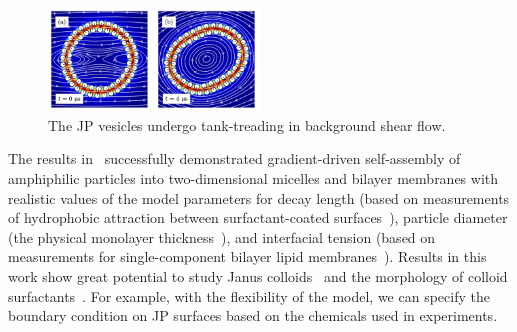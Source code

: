 \begin{figure}
\includegraphics[width=0.5\textwidth]{figures/PreliminaryWork/TankTreading.jpg}
\caption{\label{fig:JPv_linearshear}The JP vesicles undergo tank-treading in background shear flow.}
\end{figure}
The results in~\cite{Fu2018_SIAM}
successfully demonstrated gradient-driven
self-assembly of amphiphilic particles into two-dimensional micelles and
bilayer membranes with realistic values of the model parameters
for decay
length %
(based on measurements of hydrophobic attraction
between surfactant-coated surfaces~\cite{Eriksson1989, Lin2005,
  Parsegian, Israelachvili80}), particle diameter %
(the
physical monolayer thickness~\cite{Boal}), and interfacial tension
(based on measurements for single-component
bilayer lipid membranes~\cite{GarciaSaez, KUZMIN2005, Petelska2012,
Jackson2016}).
%
%
Results in this work show great potential to study Janus
colloids~\cite{Bradley2017,Mallory2017} and the morphology of colloid
surfactants~\cite{Bradley2016}.  For example, with the flexibility of
the model, we can specify the boundary condition on JP surfaces based on
the chemicals used in experiments.

